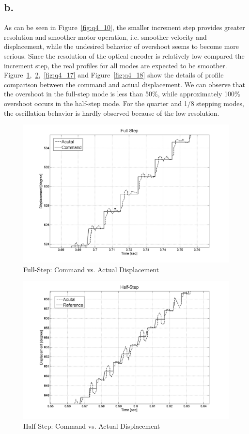 \documentclass{article}
\theoremstyle{plain}
\theoremstyle{definition}
\theoremstyle{remark}
\begin{document}
\subsection*{b.}

As can be seen in Figure~\ref{fig:q4_10}, the smaller increment step provides greater resolution and smoother motor operation, i.e. smoother velocity and displacement, while the undesired behavior of overshoot seems to become more serious. Since the resolution of the optical encoder is relatively low compared the increment step, the real profiles for all modes are expected to be smoother. Figure~\ref{fig:q4_15},~\ref{fig:q4_16},~\ref{fig:q4_17} and Figure~\ref{fig:q4_18} show the details of profile comparison between the command and actual displacement. We can observe that the overshoot in the full-step mode is less than 50\%, while approximately 100\% overshoot occurs in the half-step mode. For the quarter and 1/8 stepping modes, the oscillation behavior is hardly observed because of the low resolution. 

\begin{figure}[b]
\includegraphics[width=1\textwidth]{Q4_full_step_L.png}
\caption{Full-Step: Command vs. Actual Displacement} \label{tex}
\label{fig:q4_15}
\end{figure}

\begin{figure}[b]
\includegraphics[width=1\textwidth]{Q4_half_step_L.png}
\caption{Half-Step: Command vs. Actual Displacement} \label{tex}
\label{fig:q4_16}
\end{figure}
\end{document}
